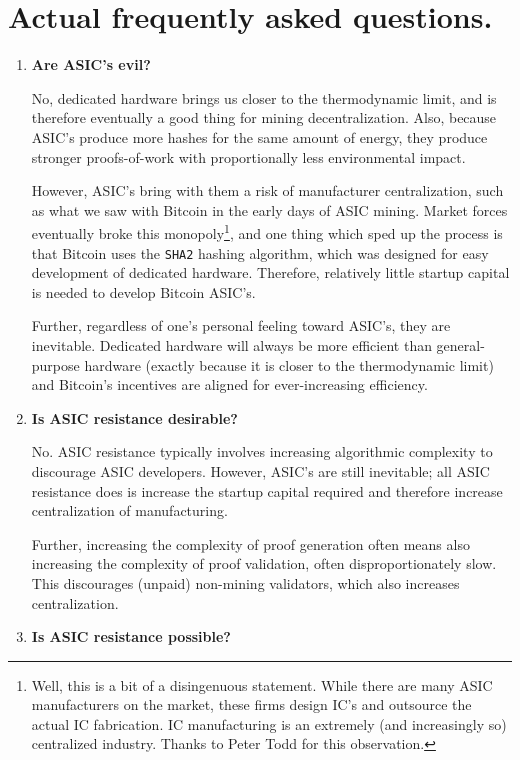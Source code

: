 \documentclass[letterpaper]{article}
\theoremstyle{xxx}
\theoremstyle{evil}
\theoremstyle{yyy}
\theoremstyle{plain}
\theoremstyle{zzz}
\begin{document}
\section{Actual frequently asked questions.}

\begin{enumerate}
\item \textbf{Are ASIC's evil?}

No, dedicated hardware brings us closer to the thermodynamic limit,
and is therefore eventually a good thing for mining decentralization.
Also, because ASIC's produce more hashes for the same amount of
energy, they produce stronger proofs-of-work with proportionally less
environmental impact.

However, ASIC's bring with them a risk of manufacturer centralization,
such as what we saw with Bitcoin in the early days of ASIC mining.
Market forces eventually broke this monopoly\footnote{Well, this is a
bit of a disingenuous statement. While there are many ASIC manufacturers
on the market, these firms design IC's and outsource the actual IC fabrication.
IC manufacturing is an extremely (and increasingly so) centralized industry.
Thanks to Peter Todd for this observation.}, 
and one thing which sped up the process is that Bitcoin uses the \texttt{SHA2}
hashing algorithm,
which was designed for easy development of dedicated hardware. Therefore,
relatively little startup capital is needed to develop Bitcoin ASIC's.

Further, regardless of one's personal feeling toward ASIC's, they
are inevitable. Dedicated hardware will always be more efficient
than general-purpose hardware (exactly because it is closer to the
thermodynamic limit) and Bitcoin's incentives are aligned for
ever-increasing efficiency.

\item \textbf{Is ASIC resistance desirable?}

No. ASIC resistance typically involves increasing algorithmic
complexity to discourage ASIC developers. However, ASIC's are
still inevitable; all ASIC resistance does is increase the
startup capital required and therefore increase centralization
of manufacturing.

Further, increasing the complexity of proof generation often means
also increasing the complexity of proof validation, often
disproportionately slow. This discourages (unpaid) non-mining
validators, which also increases centralization.

\item \textbf{Is ASIC resistance possible?}


\end{enumerate}
\end{document}

